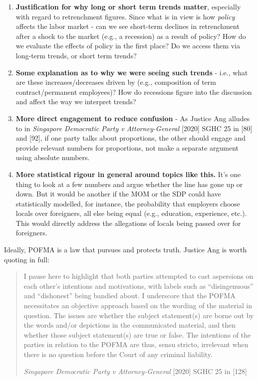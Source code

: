\documentclass[
  openany]{book}
\providecommand{\tightlist}{%
  \setlength{\itemsep}{0pt}\setlength{\parskip}{0pt}}
\begin{document}
\begin{enumerate}
\def\labelenumi{\arabic{enumi}.}
\tightlist
\item
  \textbf{Justification for why long or short term trends matter}, especially with regard to retrenchment figures. Since what is in view is how \emph{policy} affects the labor market - can we see short-term declines in retrenchment after a shock to the market (e.g., a recession) as a result of policy? How do we evaluate the effects of policy in the first place? Do we access them via long-term trends, or short term trends?
\item
  \textbf{Some explanation as to why we were seeing such trends} - i.e., what are these increases/decreases driven by (e.g., composition of term contract/permanent employees)? How do recessions figure into the discussion and affect the way we interpret trends?
\item
  \textbf{More direct engagement to reduce confusion} - As Justice Ang alludes to in \emph{Singapore Democratic Party v Attorney-General} {[}2020{]} SGHC 25 in {[}80{]} and {[}92{]}, if one party talks about proportions, the other should engage and provide relevant numbers for proportions, not make a separate argument using absolute numbers.
\item
  \textbf{More statistical rigour in general around topics like this.} It's one thing to look at a few numbers and argue whether the line has gone up or down. But it would be another if the MOM or the SDP could have statistically modelled, for instance, the probability that employers choose locals over foreigners, all else being equal (e.g., education, experience, etc.). This would directly address the allegations of locals being passed over for foreigners.
\end{enumerate}

Ideally, POFMA is a law that pursues and protects truth. Justice Ang is worth quoting in full:

\begin{quote}
I pause here to highlight that both parties attempted to cast aspersions on each other's intentions and motivations, with labels such as ``disingenuous'' and ``dishonest'' being bandied about. I underscore that the POFMA necessitates an objective approach based on the wording of the material in question. The issues are whether the subject statement(s) are borne out by the words and/or depictions in the communicated material, and then whether those subject statement(s) are true or false. The intentions of the parties in relation to the POFMA are thus, sensu stricto, irrelevant when there is no question before the Court of any criminal liability.

\emph{Singapore Democratic Party v Attorney-General} {[}2020{]} SGHC 25 in {[}128{]}
\end{quote}
\end{document}
